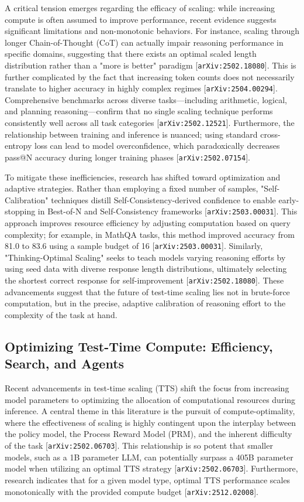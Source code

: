 \documentclass[11pt]{article}
\begin{document}
A critical tension emerges regarding the efficacy of scaling: while increasing compute is often assumed to improve performance, recent evidence suggests significant limitations and non-monotonic behaviors. For instance, scaling through longer Chain-of-Thought (CoT) can actually impair reasoning performance in specific domains, suggesting that there exists an optimal scaled length distribution rather than a "more is better" paradigm [\texttt{arXiv:2502.18080}]. This is further complicated by the fact that increasing token counts does not necessarily translate to higher accuracy in highly complex regimes [\texttt{arXiv:2504.00294}]. Comprehensive benchmarks across diverse tasks—including arithmetic, logical, and planning reasoning—confirm that no single scaling technique performs consistently well across all task categories [\texttt{arXiv:2502.12521}]. Furthermore, the relationship between training and inference is nuanced; using standard cross-entropy loss can lead to model overconfidence, which paradoxically decreases pass@N accuracy during longer training phases [\texttt{arXiv:2502.07154}].

To mitigate these inefficiencies, research has shifted toward optimization and adaptive strategies. Rather than employing a fixed number of samples, "Self-Calibration" techniques distill Self-Consistency-derived confidence to enable early-stopping in Best-of-N and Self-Consistency frameworks [\texttt{arXiv:2503.00031}]. This approach improves resource efficiency by adjusting computation based on query complexity; for example, in MathQA tasks, this method improved accuracy from 81.0 to 83.6 using a sample budget of 16 [\texttt{arXiv:2503.00031}]. Similarly, "Thinking-Optimal Scaling" seeks to teach models varying reasoning efforts by using seed data with diverse response length distributions, ultimately selecting the shortest correct response for self-improvement [\texttt{arXiv:2502.18080}]. These advancements suggest that the future of test-time scaling lies not in brute-force computation, but in the precise, adaptive calibration of reasoning effort to the complexity of the task at hand.

\subsection{Optimizing Test-Time Compute: Efficiency, Search, and Agents}

Recent advancements in test-time scaling (TTS) shift the focus from increasing model parameters to optimizing the allocation of computational resources during inference. A central theme in this literature is the pursuit of compute-optimality, where the effectiveness of scaling is highly contingent upon the interplay between the policy model, the Process Reward Model (PRM), and the inherent difficulty of the task [\texttt{arXiv:2502.06703}]. This relationship is so potent that smaller models, such as a 1B parameter LLM, can potentially surpass a 405B parameter model when utilizing an optimal TTS strategy [\texttt{arXiv:2502.06703}]. Furthermore, research indicates that for a given model type, optimal TTS performance scales monotonically with the provided compute budget [\texttt{arXiv:2512.02008}].
\end{document}
